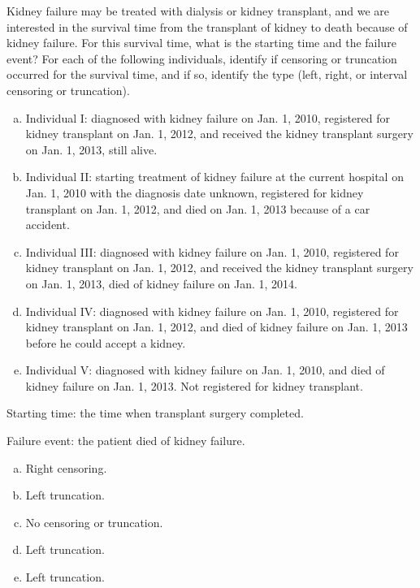 \documentclass[12pt]{elegantbook}
\begin{document}
    \begin{exercise}
        Kidney failure may be treated with dialysis or kidney transplant, and we are interested in the survival time from the transplant of kidney to death because of kidney failure. For this survival time, what is the starting time and the failure event? For each of the following individuals, identify if censoring or truncation occurred for the survival time, and if so, identify the type (left, right, or interval censoring or truncation). 
        \begin{enumerate}[(a)]
            \item Individual I: diagnosed with kidney failure on Jan. 1, 2010, registered for kidney transplant on Jan. 1, 2012, and received the kidney transplant surgery on Jan. 1, 2013, still alive.
            \item Individual II: starting treatment of kidney failure at the current hospital on Jan. 1, 2010 with the diagnosis date unknown, registered for kidney transplant on Jan. 1, 2012, and died on Jan. 1, 2013 because of a car accident. 
            \item Individual III: diagnosed with kidney failure on Jan. 1, 2010, registered for kidney transplant on Jan. 1, 2012, and received the kidney transplant surgery on Jan. 1, 2013, died of kidney failure on Jan. 1, 2014. 
            \item Individual IV: diagnosed with kidney failure on Jan. 1, 2010, registered for kidney transplant on Jan. 1, 2012, and died of kidney failure on Jan. 1, 2013 before he
            could accept a kidney. 
            \item Individual V: diagnosed with kidney failure on Jan. 1, 2010, and died of kidney failure on Jan. 1, 2013. Not registered for kidney transplant.
        \end{enumerate}
    \end{exercise}

    \begin{solution}

        Starting time: the time when transplant surgery completed. 

        Failure event: the patient died of kidney failure. 
        \begin{enumerate}[(a)]
            \item Right censoring. 
            \item Left truncation. 
            \item No censoring or truncation. 
            \item Left truncation. 
            \item Left truncation. 
        \end{enumerate}
    \end{solution}
    
\end{document}
